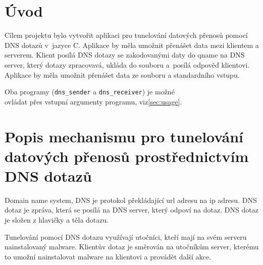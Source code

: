\section{Úvod}\label{sec:uvod}

Cílem projektu bylo vytvořit aplikaci pro tunelování datových přenosů pomocí\\
DNS dotazů v~jazyce C.
Aplikace by měla umožnit přenášet data mezi klientem a serverem.
Klient posílá DNS dotazy se zakodovanými daty do qname na DNS server,
který dotazy zpracovavá, ukláda do souboru a~posílá odpověď klientovi.
Aplikace by měla umožnit přenášet data ze souboru a standardního vstupu.

Oba programy (\texttt{dns\_sender} a \texttt{dns\_receiver}) je možné\\
ovládat přes vstupní argumenty programu, viz\ref{sec:usage}.



\section{Popis mechanismu pro tunelování datových přenosů prostřednictvím DNS dotazů}
\label{sec:popis-mechanismu-pro-tunelovani-datovych-prenosu-prostrednictvim-dns-dotazu}

Domain name system, DNS je protokol překládající url adresu na ip adresu.
DNS dotaz je zpráva, která se posílá na DNS server, který odpoví na dotaz.
DNS dotaz je složen z hlavičky a těla dotazu\cite{dnsPacket}.

Tunelování pomocí DNS dotazu využívají utočníci, kteří
mají na svém serveru nainstalovaný malware.
Klientův dotaz je směrován na utočníkům server, kterému to umožní
nainstalovat malware na klientovi a provádět další akce.
